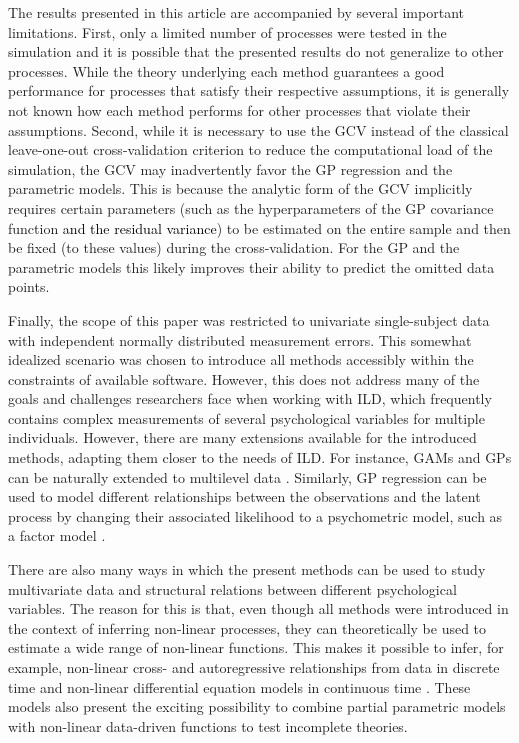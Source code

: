 \documentclass[man, floatsintext]{apa7}
\begin{document}
The results presented in this article are accompanied by several important
limitations. First, only a limited number of processes were tested in the
simulation and it is possible that the presented results do not generalize to
other processes. While the theory underlying each method guarantees a good
performance for processes that satisfy their respective assumptions, it is
generally not known how each method performs for other processes that violate
their assumptions. Second, while it is necessary to use the GCV instead of the
classical leave-one-out cross-validation criterion to reduce the computational
load of the simulation, the GCV may inadvertently favor the GP regression and
the parametric models. This is because the analytic form of the GCV
implicitly requires certain parameters (such as the hyperparameters of the GP
covariance function \textcolor{black}{and the residual variance}) to be
estimated on the entire sample and then be fixed (to these values) during the
cross-validation. For the GP and the parametric models this likely improves
their ability to predict the omitted data points.

Finally, the scope of this paper was restricted to univariate single-subject
data with independent normally distributed measurement errors. This somewhat
idealized scenario was chosen to introduce all methods accessibly within the
constraints of available software. However, this does not address many of the
goals and challenges researchers face when working with ILD, which
frequently contains complex measurements of several psychological variables for
multiple individuals. However, there are many extensions available for the
introduced methods, adapting them closer to the needs of ILD\@. For instance,
GAMs and GPs can be naturally extended to multilevel data
\parencite{karch_gaussian_2020, wood_generalized_2006}. Similarly, GP
regression can be used to model different relationships between the
observations and the latent process by changing their associated likelihood to
a psychometric model, such as a factor model \parencite{clark_dynamic_2023,
  yu_gaussian-process_2009}.

There are also many ways in which the present methods can be used to study
multivariate data and structural relations between different psychological
variables. The reason for this is that, even though all methods were introduced
in the context of inferring non-linear processes, they can theoretically be
used to estimate a wide range of non-linear functions. This makes it possible
to infer, for example, non-linear cross- and autoregressive relationships from
data in discrete time \parencite{bringmann_modeling_2015,
  wood_generalized_2006, rasmussen_gaussian_2006,
  eleftheriadis_identification_2017} and non-linear differential equation
models
in continuous time \parencite{yildiz_learning_2018}. These models also present
the exciting possibility to combine partial parametric models with non-linear
data-driven functions to test incomplete theories.
\end{document}
